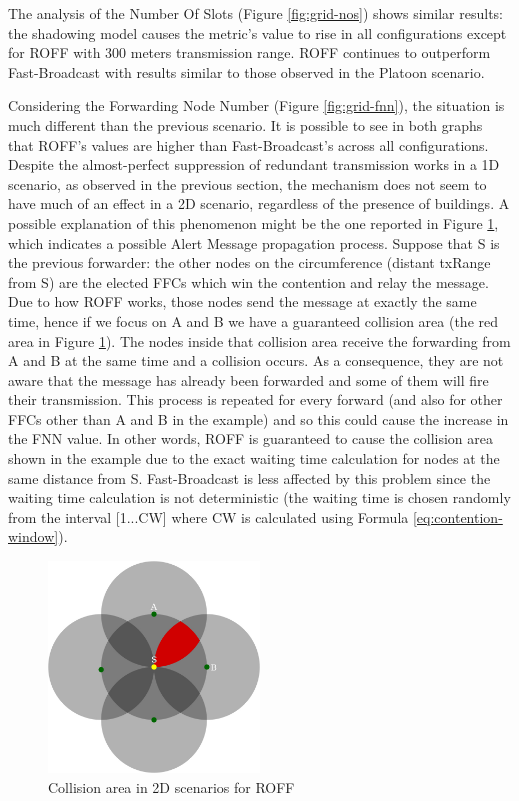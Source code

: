 		
		The analysis of the Number Of Slots (Figure \ref{fig:grid-nos}) shows similar results: the shadowing model causes the metric's value to rise in all configurations except for ROFF with 300 meters transmission range. ROFF continues to outperform Fast-Broadcast with results similar to those observed in the Platoon scenario. 
		
		
		Considering the Forwarding Node Number (Figure \ref{fig:grid-fnn}), the situation is much different than the previous scenario. It is possible to see in both graphs that ROFF's values are higher than Fast-Broadcast's across all configurations. Despite the almost-perfect suppression of redundant transmission works in a 1D scenario, as observed in the previous section, the mechanism does not seem to have much of an effect in a 2D scenario, regardless of the presence of buildings. A possible explanation of this phenomenon might be the one reported in Figure \ref{fig:2d-roff}, which indicates a possible Alert Message propagation process. Suppose that S is the previous forwarder: the other nodes on the circumference (distant txRange from S) are the elected FFCs which win the contention and relay the message. Due to how ROFF works, those nodes send the message at exactly the same time, hence if we focus on A and B we have a guaranteed collision area (the red area in Figure \ref{fig:2d-roff}). The nodes inside that collision area receive the forwarding from A and B at the same time and a collision occurs. As a consequence, they are not aware that the message has already been forwarded and some of them will fire their transmission. This process is repeated for every forward (and also for other FFCs other than A and B in the example) and so this could cause the increase in the FNN value. In other words, ROFF is guaranteed to cause the collision area shown in the example due to the exact waiting time calculation for nodes at the same distance from S. Fast-Broadcast is less affected by this problem since the waiting time calculation is not deterministic (the waiting time is chosen randomly from the interval [1...CW] where CW is calculated using Formula \ref{eq:contention-window}).
	
		\begin{figure}[H]
			\centering
			\includegraphics[width=0.5\textwidth]{immagini/2d-roff}
			\caption{Collision area in 2D scenarios for ROFF}
			\label{fig:2d-roff}
		\end{figure}

